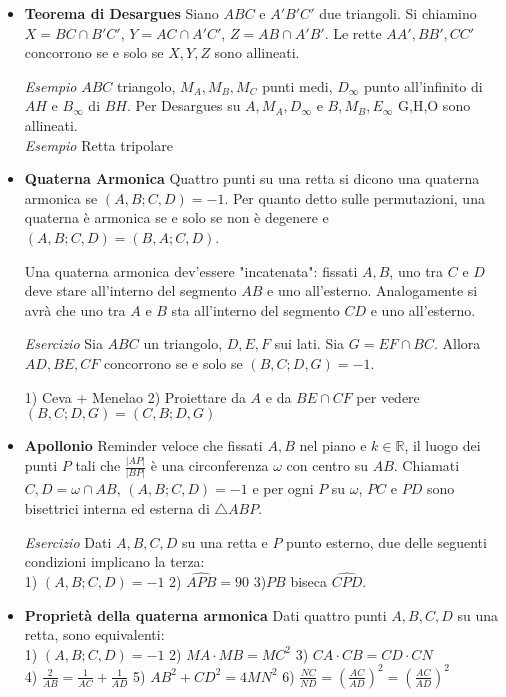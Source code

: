 \begin{itemize}
\item \textbf{Teorema di Desargues} Siano $ABC$ e $A'B'C'$ due triangoli. Si chiamino $X=BC\cap B'C'$, $Y=AC\cap A'C'$, $Z=AB\cap A'B'$. Le rette $AA',BB',CC'$ concorrono se e solo se $X,Y,Z$ sono allineati.

\textit{Esempio} $ABC$ triangolo, $M_A,M_B,M_C$ punti medi, $D_{\infty}$ punto all'infinito di $AH$ e $B_{\infty}$ di $BH$. Per Desargues su $A,M_A,D_\infty$ e $B,M_B,E_{\infty}$ G,H,O sono allineati. \\
\textit{Esempio} Retta tripolare


\item \textbf{Quaterna Armonica} Quattro punti su una retta si dicono una quaterna armonica se $(A,B;C,D)=-1$. Per quanto detto sulle permutazioni, una quaterna è armonica se e solo se non è degenere e $(A,B;C,D)=(B,A;C,D)$.

Una quaterna armonica dev'essere "incatenata": fissati $A,B$, uno tra $C$ e $D$ deve stare all'interno del segmento $AB$ e uno all'esterno. Analogamente si avrà che uno tra $A$ e $B$ sta all'interno del segmento $CD$ e uno all'esterno.

\emph{Esercizio} Sia $ABC$ un triangolo, $D,E,F$ sui lati. Sia $G=EF\cap BC$. Allora $AD,BE,CF$ concorrono se e solo se $(B,C;D,G)=-1$.\\
\begin{sol}
1) Ceva + Menelao 2) Proiettare da $A$ e da $BE\cap CF$ per vedere $(B,C;D,G)=(C,B;D,G)$ 
\end{sol}

\item \textbf{Apollonio} Reminder veloce che fissati $A,B$ nel piano e $k\in \mathbb{R}$, il luogo dei punti $P$ tali che $\frac{|AP|}{|BP|}$ è una circonferenza $\omega$ con centro su $AB$. Chiamati $C,D=\omega \cap AB$, $(A,B;C,D)=-1$ e per ogni $P$ su $\omega$, $PC$ e $PD$ sono bisettrici interna ed esterna di $\triangle ABP$. 

\emph{Esercizio} Dati $A,B,C,D$ su una retta e $P$ punto esterno, due delle seguenti condizioni implicano la terza:\\
1) $(A,B;C,D)=-1$ \hspace{0.2cm} 2) $\widehat{APB}=90$  \hspace{0.3cm} 3)$PB$ biseca $\widehat{CPD}$.

\item \textbf{Proprietà della quaterna armonica} Dati quattro punti $A,B,C,D$ su una retta, sono equivalenti:\\
1) $(A,B;C,D)=-1$ \hspace{0.2cm}2) $MA\cdot MB=MC^2$ \hspace{0.2cm} 3) $CA\cdot CB=CD\cdot CN$  \hspace{0.2cm}\\ 4)  $\displaystyle\frac{2}{AB}=\displaystyle\frac{1}{AC}+\displaystyle\frac{1}{AD}$  \hspace{0.2cm} 5)  $AB^2+CD^2=4MN^2$  \hspace{0.2cm} 6)  $\frac{NC}{ND}=\left(\frac{AC}{AD}\right)^2=\left(\frac{AC}{AD}\right)^2$


\end{itemize}
